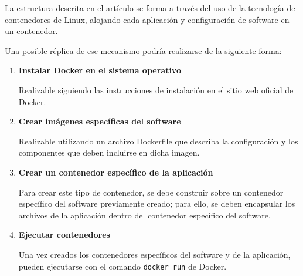                 La estructura descrita en el artículo se forma a través del uso de la tecnología de contenedores de Linux, alojando cada aplicación y configuración de software en un contenedor.

                Una posible réplica de ese mecanismo podría realizarse de la siguiente forma:

                \begin{enumerate}

                    \item \textbf{Instalar Docker en el sistema operativo}
                    
                    Realizable siguiendo las instrucciones de instalación en el sitio web oficial de Docker.
                
                    \item \textbf{Crear imágenes específicas del software}
                    
                    Realizable utilizando un archivo Dockerfile que describa la configuración y los componentes que deben incluirse en dicha imagen.

                    \item \textbf{Crear un contenedor específico de la aplicación}

                    Para crear este tipo de contenedor, se debe construir sobre un contenedor específico del software previamente creado; para ello, se deben encapsular los archivos de la aplicación dentro del contenedor específico del software.

                    \item \textbf{Ejecutar contenedores}
                    
                    Una vez creados los contenedores específicos del software y de la aplicación, pueden ejecutarse con el comando \texttt{docker run} de Docker.

                \end{enumerate}
                
